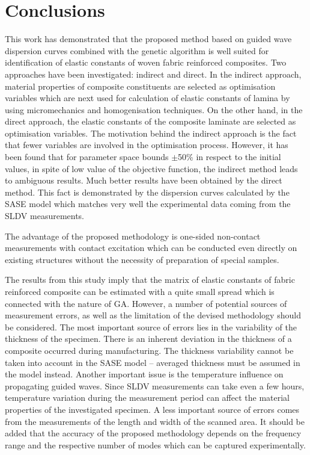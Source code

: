 \documentclass[preprint,12pt]{elsarticle}
\begin{document}
	\section{Conclusions}
	This work has demonstrated that the proposed method based on guided wave dispersion curves combined with the genetic algorithm is well suited for identification of elastic constants of woven fabric reinforced composites. Two approaches have been investigated: indirect and direct.  In the indirect approach, material properties of composite constituents are selected as optimisation variables which are next used for calculation of elastic constants of lamina by using micromechanics and homogenisation techniques. On the other hand, in the direct approach, the elastic constants of the composite laminate are selected as optimisation variables. The motivation behind the indirect approach is the fact that fewer variables are involved in the optimisation process. However, it has been found that for parameter space bounds  $\pm$50\% in respect to the initial values, in spite of low value of the objective function, the indirect method leads to ambiguous results.  Much better results have been obtained by the direct method. This fact is demonstrated by the dispersion curves calculated by the SASE model which matches very well the experimental data coming from the SLDV measurements. 
	
	The advantage of the proposed methodology is one-sided non-contact measurements with contact excitation which can be conducted even directly on existing structures without the necessity of preparation of special samples.
	
	The results from this study imply that the matrix of elastic constants of fabric reinforced composite can be estimated with a quite small spread which is connected with the nature of GA. However, a number of potential sources of measurement errors, as well as the limitation of the devised methodology should be considered. The most important source of errors lies in the variability of the thickness of the specimen. There is an inherent deviation in the thickness of a composite occurred during manufacturing. The thickness variability cannot be taken into account in the SASE model -- averaged thickness must be assumed in the model instead. Another important issue is the temperature influence on propagating guided waves. Since SLDV measurements can take even a few hours, temperature variation during the measurement period can affect the material properties of the investigated specimen. A less important source of errors comes from the measurements of the length and width of the scanned area. It should be added that the accuracy of the proposed methodology depends on the frequency range and the respective number of modes which can be captured experimentally.
	
\end{document}
